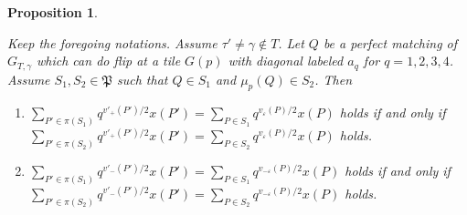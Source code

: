 \documentclass[10pt]{amsart}
\theoremstyle{theorems}
\newtheorem{Proposition}[Theorem]{Proposition}
\begin{document}
\medskip

\begin{Proposition}\label{general-a}

Keep the foregoing notations. Assume $\tau'\neq\gamma\notin T$. Let $Q$ be a perfect matching of $G_{T,\gamma}$ which can do flip at a tile $G(p)$ with diagonal labeled $a_q$ for $q=1,2,3,4$. Assume $S_1,S_2\in \mathfrak P$ such that $Q\in S_1$ and $\mu_{p}(Q)\in S_2$. Then

\begin{enumerate}[$(1)$]

  \item $\sum_{P'\in \pi(S_1)}q^{v'_{+}(P')/2}x(P')=\sum_{P\in S_1}q^{v_{\varepsilon}(P)/2}x(P)$ holds if and only if\\
   $\sum_{P'\in \pi(S_2)}q^{v'_{+}(P')/2}x(P')=\sum_{P\in S_2}q^{v_{\varepsilon}(P)/2}x(P)$ holds.

  \item $\sum_{P'\in \pi(S_1)}q^{v'_{-}(P')/2}x(P')=\sum_{P\in S_1}q^{v_{-\varepsilon}(P)/2}x(P)$ holds if and only if\\
   $\sum_{P'\in \pi(S_2)}q^{v'_{-}(P')/2}x(P')=\sum_{P\in S_2}q^{v_{-\varepsilon}(P)/2}x(P)$ holds.

\end{enumerate}

\end{Proposition}
\end{document}
